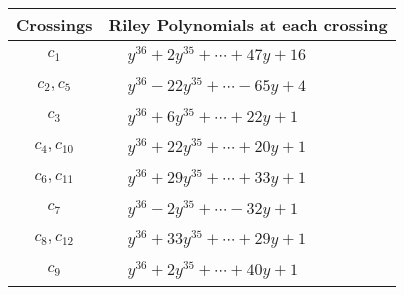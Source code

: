 \documentclass[1p]{elsarticle_modified}
\theoremstyle{definition}
\begin{document}
\begin{tabular}{m{50pt}|m{274pt}}
Crossings & \hspace{64pt}Riley Polynomials at each crossing \\
\hline $$\begin{aligned}c_{1}\end{aligned}$$&$\begin{aligned}
&y^{36}+2 y^{35}+\cdots+47 y+16
\end{aligned}$\\
\hline $$\begin{aligned}c_{2},c_{5}\end{aligned}$$&$\begin{aligned}
&y^{36}-22 y^{35}+\cdots-65 y+4
\end{aligned}$\\
\hline $$\begin{aligned}c_{3}\end{aligned}$$&$\begin{aligned}
&y^{36}+6 y^{35}+\cdots+22 y+1
\end{aligned}$\\
\hline $$\begin{aligned}c_{4},c_{10}\end{aligned}$$&$\begin{aligned}
&y^{36}+22 y^{35}+\cdots+20 y+1
\end{aligned}$\\
\hline $$\begin{aligned}c_{6},c_{11}\end{aligned}$$&$\begin{aligned}
&y^{36}+29 y^{35}+\cdots+33 y+1
\end{aligned}$\\
\hline $$\begin{aligned}c_{7}\end{aligned}$$&$\begin{aligned}
&y^{36}-2 y^{35}+\cdots-32 y+1
\end{aligned}$\\
\hline $$\begin{aligned}c_{8},c_{12}\end{aligned}$$&$\begin{aligned}
&y^{36}+33 y^{35}+\cdots+29 y+1
\end{aligned}$\\
\hline $$\begin{aligned}c_{9}\end{aligned}$$&$\begin{aligned}
&y^{36}+2 y^{35}+\cdots+40 y+1
\end{aligned}$\\
\hline
\end{tabular}\\~\\
\end{document}
